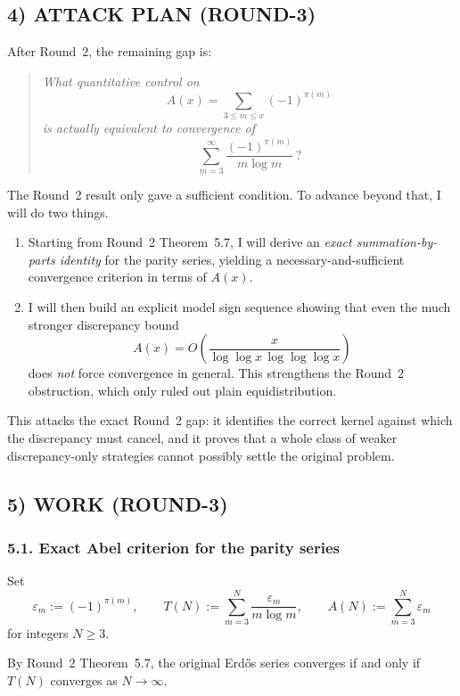 \subsection*{4) ATTACK PLAN (ROUND-3)}

After Round~2, the remaining gap is:

\begin{quote}
\emph{What quantitative control on}
\[
A(x)=\sum_{3\le m\le x} (-1)^{\pi(m)}
\]
\emph{is actually equivalent to convergence of}
\[
\sum_{m=3}^\infty \frac{(-1)^{\pi(m)}}{m\log m}\,?
\]
\end{quote}

The Round~2 result only gave a sufficient condition.
To advance beyond that, I will do two things.

\begin{enumerate}
\item Starting from Round~2 Theorem~5.7, I will derive an \emph{exact summation-by-parts identity} for the parity series, yielding a necessary-and-sufficient convergence criterion in terms of \(A(x)\).

\item I will then build an explicit model sign sequence showing that even the much stronger discrepancy bound
\[
A(x)=O\!\left(\frac{x}{\log\log x\,\log\log\log x}\right)
\]
does \emph{not} force convergence in general.
This strengthens the Round~2 obstruction, which only ruled out plain equidistribution.
\end{enumerate}

This attacks the exact Round~2 gap: it identifies the correct kernel against which the discrepancy must cancel, and it proves that a whole class of weaker discrepancy-only strategies cannot possibly settle the original problem.

\subsection*{5) WORK (ROUND-3)}

\subsubsection*{5.1. Exact Abel criterion for the parity series}

Set
\[
\varepsilon_m := (-1)^{\pi(m)},\qquad
T(N):=\sum_{m=3}^N \frac{\varepsilon_m}{m\log m},\qquad
A(N):=\sum_{m=3}^N \varepsilon_m
\]
for integers \(N\ge 3\).

By Round~2 Theorem~5.7, the original Erd\H{o}s series converges if and only if \(T(N)\) converges as \(N\to\infty\).

